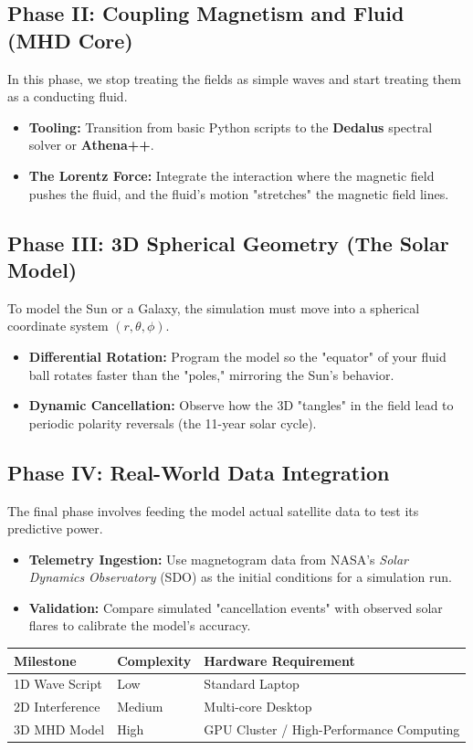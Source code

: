 \documentclass[11pt]{article}
\begin{document}
\subsection*{Phase II: Coupling Magnetism and Fluid (MHD Core)}
In this phase, we stop treating the fields as simple waves and start treating them as a conducting fluid.
\begin{itemize}
    \item \textbf{Tooling:} Transition from basic Python scripts to the \textbf{Dedalus} spectral solver or \textbf{Athena++}.
    \item \textbf{The Lorentz Force:} Integrate the interaction where the magnetic field pushes the fluid, and the fluid's motion "stretches" the magnetic field lines.
\end{itemize}

\subsection*{Phase III: 3D Spherical Geometry (The Solar Model)}
To model the Sun or a Galaxy, the simulation must move into a spherical coordinate system $(r, \theta, \phi)$.
\begin{itemize}
    \item \textbf{Differential Rotation:} Program the model so the "equator" of your fluid ball rotates faster than the "poles," mirroring the Sun's behavior.
    \item \textbf{Dynamic Cancellation:} Observe how the 3D "tangles" in the field lead to periodic polarity reversals (the 11-year solar cycle).
\end{itemize}

\subsection*{Phase IV: Real-World Data Integration}
The final phase involves feeding the model actual satellite data to test its predictive power.
\begin{itemize}
    \item \textbf{Telemetry Ingestion:} Use magnetogram data from NASA’s \textit{Solar Dynamics Observatory} (SDO) as the initial conditions for a simulation run.
    \item \textbf{Validation:} Compare simulated "cancellation events" with observed solar flares to calibrate the model’s accuracy.
\end{itemize}

\begin{table}[h]
\centering
\begin{tabular}{|l|l|l|}
\hline
\textbf{Milestone} & \textbf{Complexity} & \textbf{Hardware Requirement} \\ \hline
1D Wave Script & Low & Standard Laptop \\ \hline
2D Interference & Medium & Multi-core Desktop \\ \hline
3D MHD Model & High & GPU Cluster / High-Performance Computing \\ \hline
\end{tabular}
\end{table}
\end{document}
